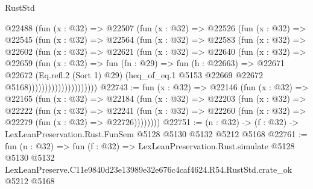 \begin{lexlean}{RustStd}
\begin{coremodule}
                      @22488
                        (fun (x : @32) =>
                        @22507
                          (fun (x : @32) =>
                          @22526
                            (fun (x : @32) =>
                            @22545
                              (fun (x : @32) =>
                              @22564
                                (fun (x : @32) =>
                                @22583
                                  (fun (x : @32) =>
                                  @22602
                                    (fun (x : @32) =>
                                    @22621
                                      (fun (x : @32) =>
                                      @22640
                                        (fun (x : @32) =>
                                        @22659
                                          (fun (x : @32) =>
                                          fun (fn : @29) =>
                                          fun (h : @22663) =>
                                          @22671
                                            @22672
                                            (Eq.refl.{2} (Sort 1) @29)
                                            (heq_of_eq.{1}
                                              @5153
                                              @22669
                                              @22672
                                              @5168)))))))))))))))))))))
@22743 := fun (x : @32) =>
  @22146
    (fun (x : @32) =>
    @22165
      (fun (x : @32) =>
      @22184
        (fun (x : @32) =>
        @22203
          (fun (x : @32) =>
          @22222
            (fun (x : @32) =>
            @22241
              (fun (x : @32) => @22260 (fun (x : @32) => @22279 (fun (x : @32) => @22726))))))))
@22751 := (n : @32) -> (f : @32) -> LexLeanPreservation.Rust.FunSem @5128 @5130 @5132 @5212 @5168
@22761 := fun (n : @32) =>
  fun (f : @32) =>
  LexLeanPreservation.Rust.simulate
    @5128
    @5130
    @5132
    LexLeanPreserve.C11e9840d23e13989e32e676c4caf4624.R54.RustStd.crate_ok
    @5212
    @5168
\end{coremodule}
\end{lexlean}
